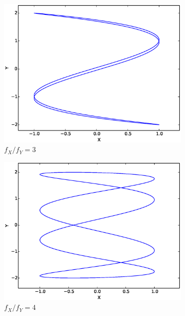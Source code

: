 \documentclass{article}
\theoremstyle{definition}
\renewcommand{\>}{\rangle}
\newcommand{\<}{\langle}
\begin{document}
\begin{figure}
\begin{subfigure}{0.48\textwidth}
\includegraphics[width=\textwidth]{ratio3.eps}
\caption{$f_X/f_Y = 3$}
\end{subfigure}
\begin{subfigure}{0.48\textwidth}\centering
\includegraphics[width=\textwidth]{ratio4.eps}
\caption{$f_X/f_Y = 4$}
\end{subfigure}
\begin{subfigure}{0.48\textwidth}\centering

\end{subfigure}
\end{figure}
\end{document}
